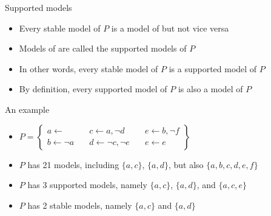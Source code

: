 \begin{frame}{Supported models}
  \bigskip
  \begin{itemize}
  \item<1-> Every stable model of $P$ is a model of \pause[2]
    but not vice versa
    \smallskip
  \item<3-> Models of  are called the \alert{supported models} of $P$
    \bigskip
  \item<4-> In other words, every stable model of $P$ is a supported model of $P$
    \smallskip
  \item<4-> By definition, every supported model of $P$ is also a model of $P$
\end{itemize}
\end{frame}
\begin{frame}{An example}
  \bigskip
  \begin{itemize}
  \item<1-> []
    \par\bigskip
    \(
    P
    =
    \left\{
      \begin{array}{lll}
        a \leftarrow                \quad &
        c \leftarrow a, \neg d      \quad &
        e \leftarrow b, \neg f
        \\
        b \leftarrow \neg a         \quad &
        d \leftarrow \neg c, \neg e \quad &
        e \leftarrow e
      \end{array}
    \right\}
    \)
    \bigskip
    \bigskip
  \item<2-> $P$ has 21           models, including $\{a,c\}$, $\{a,d\}$, but also $\{a,b,c,d,e,f\}$
    \smallskip
  \item<3-> $P$ has  3 supported models, namely $\{a,c\}$, $\{a,d\}$, and $\{a,c,e\}$
    \smallskip
  \item<4-> $P$ has  2 stable    models, namely $\{a,c\}$ and $\{a,d\}$
  \end{itemize}
\end{frame}
%
